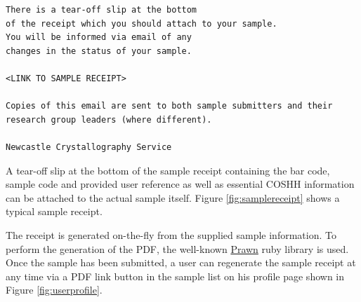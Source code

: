 \documentclass[12pt,twoside]{article}
\begin{document}
\begin{enumerate}[(i)]
\begin{verbatim}
There is a tear-off slip at the bottom
of the receipt which you should attach to your sample.
You will be informed via email of any
changes in the status of your sample.

<LINK TO SAMPLE RECEIPT>

Copies of this email are sent to both sample submitters and their
research group leaders (where different).

Newcastle Crystallography Service
\end{verbatim}
\normalsize

A tear-off slip at the bottom of the sample receipt
containing the bar code, sample code and provided user
reference as well as essential COSHH information can be attached to the
actual sample itself.
Figure \ref{fig:samplereceipt} shows a typical sample receipt.

The receipt is generated on-the-fly from the supplied sample information. 
To perform the generation of the PDF, the well-known 
\href{http://prawn.majesticseacreature.com/}{Prawn} ruby library is used.
Once the sample has been submitted, a user can regenerate the sample receipt
at any time via a PDF link button in the sample list on his profile page
shown in Figure \ref{fig:userprofile}.


\end{enumerate}
\end{document}
